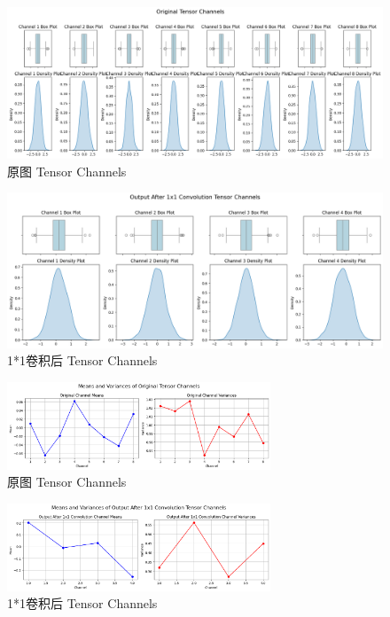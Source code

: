 \documentclass[a4paper,12pt]{article}
\begin{document}
\begin{figure}[htbp]
	\centering
	\includegraphics[width=1\textwidth]{13.png}
	\caption{原图 Tensor Channels}
\end{figure}

\begin{figure}[htbp]
	\centering
	\includegraphics[width=1\textwidth]{15.png}
	\caption{1*1卷积后 Tensor Channels}
\end{figure}

\begin{figure}[htbp]
	\centering
	\includegraphics[width=0.7\textwidth]{14.png}
	\caption{原图 Tensor Channels}
\end{figure}
\begin{figure}[htbp]
	\centering
	\includegraphics[width=0.7\textwidth]{16.png}
	\caption{1*1卷积后 Tensor Channels}
\end{figure}
\end{document}
